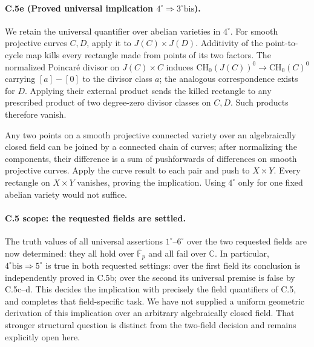 \paragraph{C.5e (Proved universal implication $4^\circ\Rightarrow3^\circ\mathrm{bis}$).}
We retain the universal quantifier over abelian varieties in
$4^\circ$. For smooth projective curves $C,D$, apply it to
$J(C)\times J(D)$. Additivity of the point-to-cycle map kills every
rectangle made from points of its two factors. The normalized
Poincar\'e divisor on $J(C)\times C$ induces
$\mathrm{CH}_0(J(C))^0\to\mathrm{CH}_0(C)^0$ carrying
$[a]-[0]$ to the divisor class $a$; the analogous correspondence
exists for $D$. Applying their external product sends the killed
rectangle to any prescribed product of two degree-zero divisor
classes on $C,D$. Such products therefore vanish.

Any two points on a smooth projective connected variety over an
algebraically closed field can be joined by a connected chain of
curves; after normalizing the components, their difference is a
sum of pushforwards of differences on smooth projective curves.
Apply the curve result to each pair and push to $X\times Y$.
Every rectangle on $X\times Y$ vanishes, proving the implication.
Using $4^\circ$ only for one fixed abelian variety would not suffice.

\paragraph{C.5 scope: the requested fields are settled.}
The truth values of all universal assertions $1^\circ$--$6^\circ$
over the two requested fields are now determined: they all hold
over $\overline{\mathbb F}_p$ and all fail over $\mathbb C$.
In particular, $4^\circ\mathrm{bis}\Rightarrow5^\circ$ is true
in both requested settings: over the first field its conclusion
is independently proved in C.5b; over the second its universal
premise is false by C.5c--d. This decides the implication with
precisely the field quantifiers of C.5, and completes that
field-specific task. We have not supplied a uniform geometric
derivation of this implication over an arbitrary algebraically
closed field. That stronger structural question is distinct
from the two-field decision and remains explicitly open here.
